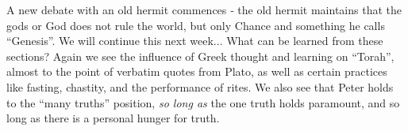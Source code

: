 A new debate with an old hermit commences ‐ the old hermit maintains that the gods or God does not rule the world, but only Chance and something he calls ``Genesis''. We will continue this next week... What can be learned from these sections? Again we see the influence of Greek thought and learning on ``Torah'', almost to the point of verbatim quotes from Plato, as well as certain practices like fasting, chastity, and the performance of rites. We also see that Peter holds to the ``many truths'' position, \emph{so long as} the one truth holds paramount, and so long as there is a personal hunger for truth.



